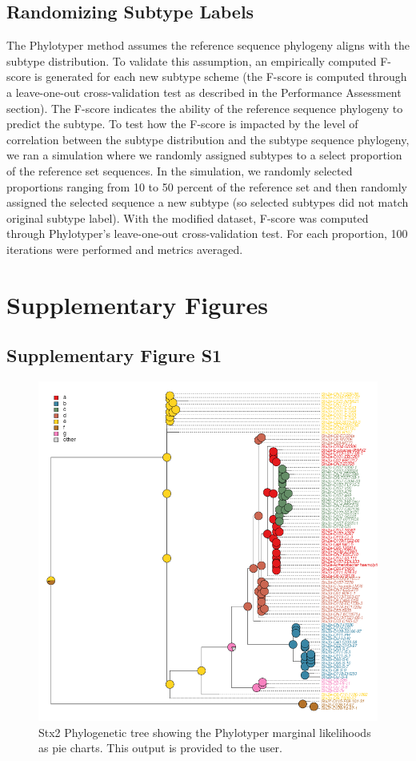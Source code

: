 \documentclass[11pt,letterpaper]{article}
\begin{document}
\subsection{Randomizing Subtype Labels}

The Phylotyper method assumes the reference sequence phylogeny aligns with the subtype distribution. To validate this assumption, an empirically computed F-score is generated for each new subtype scheme (the F-score is computed through a leave-one-out cross-validation test as described in the Performance Assessment section). The F-score indicates the ability of the reference sequence phylogeny to predict the subtype. To test how the F-score is impacted by the level of correlation between the subtype distribution and the subtype sequence phylogeny, we ran a simulation where we randomly assigned subtypes to a select proportion of the reference set sequences. In the simulation, we randomly selected proportions ranging from 10 to 50 percent of the reference set and then randomly assigned the selected sequence a new subtype (so selected subtypes did not match original subtype label). With the modified dataset, F-score was computed through Phylotyper's leave-one-out cross-validation test. For each proportion, 100 iterations were performed and metrics averaged.

\section{Supplementary Figures}

\subsection{Supplementary Figure S1}

\begin{figure}[h!]
\centering
\includegraphics[scale=0.5]{sfig01.png}
\caption{Stx2 Phylogenetic tree showing the Phylotyper marginal likelihoods as pie charts. This output is provided to the user.}
\end{figure}
\end{document}
